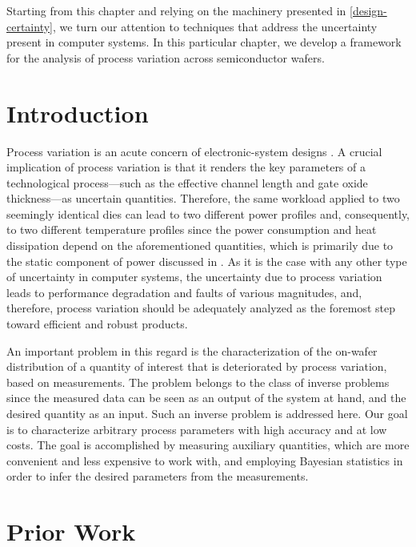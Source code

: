 Starting from this chapter and relying on the machinery presented in
\cref{design-certainty}, we turn our attention to techniques that address
the uncertainty present in computer systems. In this particular chapter, we
develop a framework for the analysis of process variation across semiconductor
wafers.

\section{Introduction}

Process variation is an acute concern of electronic-system designs
\cite{chandrakasan2000, srivastava2010}. A crucial implication of process
variation is that it renders the key parameters of a technological
process---such as the effective channel length and gate oxide thickness---as
uncertain quantities. Therefore, the same workload applied to two seemingly
identical dies can lead to two different power profiles and, consequently, to
two different temperature profiles since the power consumption and heat
dissipation depend on the aforementioned quantities, which is primarily due to
the static component of power discussed in .
As it is the case with any other type of uncertainty in computer systems, the
uncertainty due to process variation leads to performance degradation and faults
of various magnitudes, and, therefore, process variation should be adequately
analyzed as the foremost step toward efficient and robust products.

An important problem in this regard is the characterization of the on-wafer
distribution of a quantity of interest that is deteriorated by process
variation, based on measurements. The problem belongs to the class of inverse
problems since the measured data can be seen as an output of the system at hand,
and the desired quantity as an input. Such an inverse problem is addressed here.
Our goal is to characterize arbitrary process parameters with high accuracy and
at low costs. The goal is accomplished by measuring auxiliary quantities, which
are more convenient and less expensive to work with, and employing Bayesian
statistics \cite{gelman2004} in order to infer the desired parameters from the
measurements.

\section{Prior Work}

